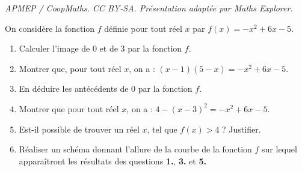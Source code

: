 \documentclass[10pt]{article}
\begin{document}
\noindent\textit{APMEP / CoopMaths. CC BY-SA. Présentation adaptée par Maths Explorer.}\par\medskip
On considère la fonction $f$ définie pour tout réel $x$ par $f(x) = -x^2 + 6x - 5$.

\begin{enumerate}
\item Calculer l'image de 0 et de 3 par la fonction $f$.

\item Montrer que, pour tout réel $x$, on a : $(x - 1)(5 - x) = -x^2 + 6x - 5$.

\item En déduire les antécédents de 0 par la fonction $f$.

\item Montrer que pour tout réel $x$, on a : $4 - (x - 3)^2 = -x^2 + 6x - 5$.

\item Est-il possible de trouver un réel $x$, tel que $f(x) > 4$ ? Justifier.

\item Réaliser un schéma donnant l'allure de la courbe de la fonction $f$ sur lequel apparaîtront les résultats des questions \textbf{1.}, \textbf{3.} et \textbf{5.}
\end{enumerate}
\end{document}
